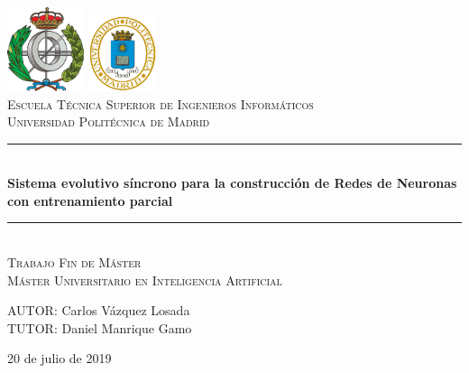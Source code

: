 \documentclass[spanish,a4paper,12pt,twoside]{report}
\begin{document}
  \begin{titlepage}
    \newcommand{\HRule}{\rule{\linewidth}{0.5mm}}
    \begin{center}
      \includegraphics[width = 2.25cm]{resources/FACINFO}
      \hspace{8cm}
      \includegraphics[width = 2cm]{resources/logoupm.png}
      \\[1cm]

      \textsc{\Large Escuela Técnica Superior de Ingenieros Informáticos}
      \\[0.5cm]
      \textsc{\large Universidad Politécnica de Madrid}
      \\[3cm]

      \HRule \\[0.4cm]
      {\huge \bfseries Sistema evolutivo síncrono para la construcción de Redes de Neuronas con entrenamiento parcial}
      \HRule \\[4cm]
    
      \textsc{\LARGE Trabajo Fin de Máster}\\[0.5cm]
      \textsc{\Large Máster Universitario en Inteligencia Artificial}\\[3cm]
    \end{center}
    \begin{flushright}
      \large AUTOR: Carlos Vázquez Losada \\TUTOR: Daniel Manrique Gamo
      \\[2.1cm]
    \end{flushright}
    \begin{center}
      {{20 de julio de 2019}}
    \end{center}
    \vfill
  \end{titlepage}
  \newpage\cleardoublepage
\end{document}

